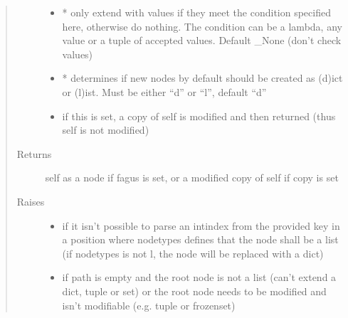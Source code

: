 \documentclass[a4paper,10pt,english]{sphinxmanual}
\begin{document}
\begin{fulllineitems}
\begin{fulllineitems}
\begin{quote}
\begin{description}
\begin{itemize}
\item {}
\sphinxAtStartPar
{} \textendash{} * only extend with values if they meet the condition specified here, otherwise do nothing. The
condition can be a lambda, any value or a tuple of accepted values. Default \_None (don’t check values)

\item {}
\sphinxAtStartPar
{} \textendash{} * determines if new nodes by default should be created as (d)ict or (l)ist. Must be
either “d” or “l”, default “d”

\item {}
\sphinxAtStartPar
{} \textendash{} if this is set, a copy of self is modified and then returned (thus self is not modified)

\end{itemize}

\item[{Returns}] \leavevmode
\sphinxAtStartPar
self as a node if fagus is set, or a modified copy of self if copy is set

\item[{Raises}] \leavevmode\begin{itemize}
\item {}
\sphinxAtStartPar
{} \textendash{} if it isn’t possible to parse an int\sphinxhyphen{}index from the provided key in a position where node\sphinxhyphen{}types
    defines that the node shall be a list (if node\sphinxhyphen{}types is not l, the node will be replaced with a dict)

\item {}
\sphinxAtStartPar
{} \textendash{} if path is empty and the root node is not a list (can’t extend a dict, tuple or set) or the
    root node needs to be modified and isn’t modifiable (e.g. tuple or frozenset)

\end{itemize}

\end{description}\end{quote}

\end{fulllineitems}



\end{fulllineitems}
\end{document}
